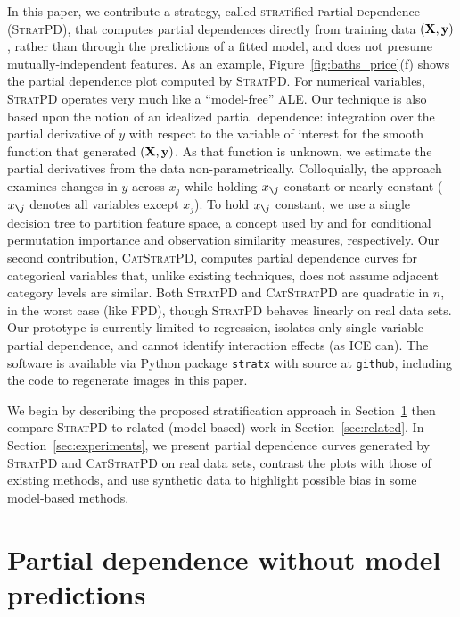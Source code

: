 \documentclass[smallextended]{svjour3}       %
\newcommand{\secref}[1]{Section~\ref{#1}}
\newcommand{\figref}[1]{Figure~\ref{#1}}
\newcommand{\spd}{\fontfamily{cmr}\textsc{\small StratPD}}
\newcommand{\cspd}{\fontfamily{cmr}\textsc{\small CatStratPD}}
\newcommand{\xnj}{$x_{\texttt{\char`\\} j}$}
\begin{document}
In this paper, we contribute a strategy, called {\textsc{strat}ified \textsc{p}artial \textsc{d}ependence} (\spd{}), that computes partial dependences directly from training data $({\bf X}, {\bf y})$, rather than through the predictions of a fitted model, and does not presume mutually-independent features. As an example, \figref{fig:baths_price}(f) shows the partial dependence plot computed by \spd.  For numerical variables, \spd{} operates very much like a ``model-free'' ALE.  Our technique is also based upon the notion of an idealized partial dependence:  integration over the partial derivative of $y$ with respect to the variable of interest for the smooth function that generated $({\bf X}, {\bf y})$. As that function is unknown, we estimate the partial derivatives from the data non-parametrically.  Colloquially, the approach examines changes in $y$ across $x_j$ while holding \xnj{} constant or nearly constant (\xnj{} denotes all variables except $x_j$).  To hold \xnj{} constant, we use a single decision tree to partition feature space, a concept used by \cite{rfimp} and \cite{RFunsup} for conditional permutation importance and observation similarity measures, respectively.  Our second contribution, \cspd{}, computes partial dependence curves for categorical variables that, unlike existing techniques, does not assume adjacent category levels are similar. Both \spd{} and \cspd{} are quadratic in $n$, in the worst case (like FPD), though \spd{} behaves linearly on real data sets.  Our prototype is currently limited to regression, isolates only single-variable partial dependence, and cannot identify interaction effects (as ICE can).  The software is available via Python package {\tt stratx} with source at {\tt github}, including the code to regenerate images in this paper.

We begin by describing the proposed stratification approach in \secref{sec:stratpd} then compare \spd{} to related (model-based) work in \secref{sec:related}. In \secref{sec:experiments}, we present partial dependence curves generated by \spd{} and \cspd{} on real data sets, contrast the plots with those of existing methods, and use synthetic data to highlight possible bias in some model-based methods.

\section{Partial dependence without model predictions}\label{sec:stratpd}
\end{document}
